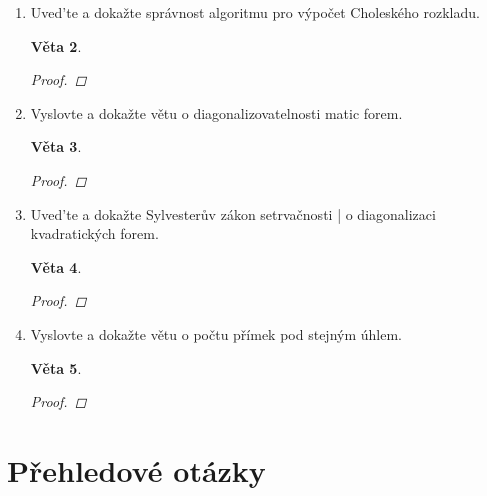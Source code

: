 \documentclass[10pt,a4paper]{article}
\theoremstyle{plain}
\newtheorem{veta}{Věta}
\theoremstyle{definition}
\begin{document}
\begin{enumerate}
\begin{veta}
\begin{proof}

\end{proof}
\end{veta}

\item Uved'te a dokažte správnost algoritmu pro výpočet Choleského rozkladu.


\begin{veta}

\begin{proof}

\end{proof}
\end{veta}

\item Vyslovte a dokažte větu o diagonalizovatelnosti matic forem.


\begin{veta}

\begin{proof}

\end{proof}
\end{veta}

\item Uved'te a dokažte Sylvesterův zákon setrvačnosti | o diagonalizaci kvadratických forem.


\begin{veta}

\begin{proof}

\end{proof}
\end{veta}


\item Vyslovte a dokažte větu o počtu přímek pod stejným úhlem.


\begin{veta}

\begin{proof}

\end{proof}
\end{veta}


\end{enumerate}


\part{Přehledové otázky}
\end{document}
